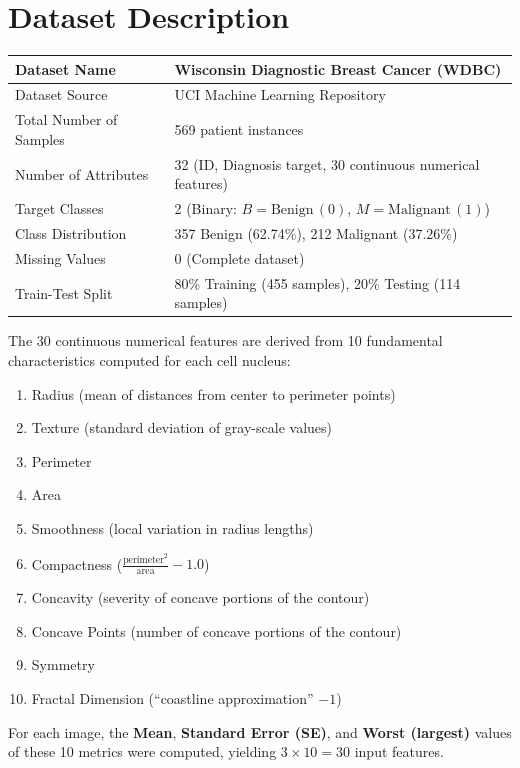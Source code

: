 \documentclass[12pt,a4paper]{article}
\begin{document}
\section{Dataset Description}
\begin{longtable}{|p{6cm}|p{8cm}|}
\hline
Dataset Name & Wisconsin Diagnostic Breast Cancer (WDBC) \\ \hline
Dataset Source & UCI Machine Learning Repository \\ \hline
Total Number of Samples & 569 patient instances \\ \hline
Number of Attributes & 32 (ID, Diagnosis target, 30 continuous numerical features) \\ \hline
Target Classes & 2 (Binary: $B = \text{Benign} \, (0)$, $M = \text{Malignant} \, (1)$) \\ \hline
Class Distribution & 357 Benign (62.74\%), 212 Malignant (37.26\%) \\ \hline
Missing Values & 0 (Complete dataset) \\ \hline
Train-Test Split & 80\% Training (455 samples), 20\% Testing (114 samples) \\ \hline
\end{longtable}

The 30 continuous numerical features are derived from 10 fundamental characteristics computed for each cell nucleus:
\begin{enumerate}[label=(\alph*)]
\item Radius (mean of distances from center to perimeter points)
\item Texture (standard deviation of gray-scale values)
\item Perimeter
\item Area
\item Smoothness (local variation in radius lengths)
\item Compactness ($\frac{\text{perimeter}^2}{\text{area}} - 1.0$)
\item Concavity (severity of concave portions of the contour)
\item Concave Points (number of concave portions of the contour)
\item Symmetry
\item Fractal Dimension (``coastline approximation'' $- 1$)
\end{enumerate}
For each image, the \textbf{Mean}, \textbf{Standard Error (SE)}, and \textbf{Worst (largest)} values of these 10 metrics were computed, yielding $3 \times 10 = 30$ input features.
\end{document}
